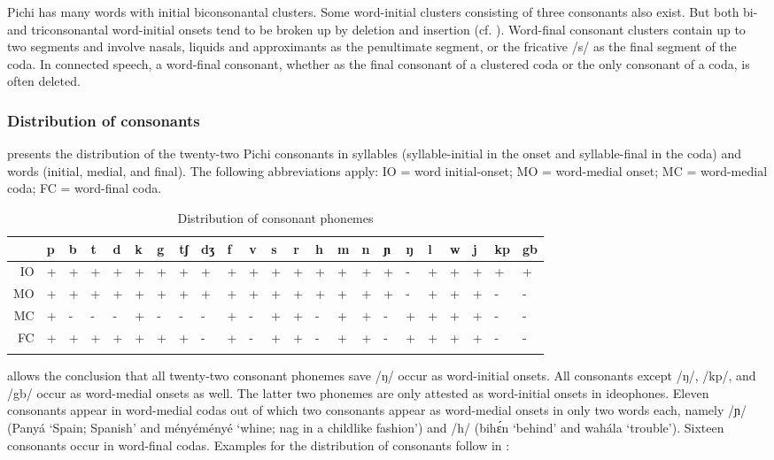 Pichi has many words with initial biconsonantal clusters. Some word-initial clusters consisting of three consonants also exist. But both bi- and triconsonantal word-initial onsets tend to be broken up by deletion and insertion (cf. ). Word-final consonant clusters contain up to two segments and involve nasals, liquids and approximants as the penultimate segment, or the fricative /s/ as the final segment of the coda. In connected speech, a word-final consonant, whether as the final consonant of a clustered coda or the only consonant of a coda, is often deleted. 


\subsubsection{Distribution of consonants}\label{sec:2.6.2.1}
 presents the distribution of the twenty-two Pichi consonants in syllables (syllable-initial in the onset and syllable-final in the coda) and words (initial, medial, and final). The following abbreviations apply: IO = word initial-onset; MO = word-medial onset; MC = word-medial coda; FC = word-final coda.

\begin{table}
\caption{Distribution of consonant phonemes}
\label{tab:key:2.5}

\begin{tabularx}{\textwidth}{rXXXXXXXXXXXXXXXXXXXXXX}
\lsptoprule
 & p & b & t & d & k & g & tʃ & dʒ & f & v & s & r & h & m & n & ɲ & ŋ & l & w & j & kp & gb\\
\midrule
\MakeUppercase{io} & + & + & + & + & + & + & + & + & + & + & + & + & + & + & + & + & {}- & + & + & + & + & +\\
\MakeUppercase{mo} & + & + & + & + & + & + & + & + & + & + & + & + & + & + & + & + & {}- & + & + & + & {}- & {}-\\
\MakeUppercase{mc} & + & {}- & {}- & {}- & + & {}- & {}- & {}- & + & {}- & + & + & {}- & + & + & {}- & + & + & + & + & {}- & {}-\\
\MakeUppercase{fc} & + & + & + & + & + & + & + & {}- & + & {}- & + & + & {}- & + & + & {}- & + & + & + & + & {}- & {}-\\
\lspbottomrule
\end{tabularx}
\end{table}

 allows the conclusion that all twenty-two consonant phonemes save /ŋ/ occur as word-initial onsets. All consonants except /ŋ/, /kp/, and /gb/ occur as word-medial onsets as well. The latter two phonemes are only attested as word-initial onsets in ideophones. Eleven consonants appear in word-medial codas out of which two consonants appear as word-medial onsets in only two words each, namely /ɲ/ (Panyá ‘Spain; Spanish’ and ményéményé ‘whine; nag in a childlike fashion’) and /h/ (bihɛ́n ‘behind’ and wahála ‘trouble’). Sixteen consonants occur in word-final codas. Examples for the distribution of consonants follow in :


